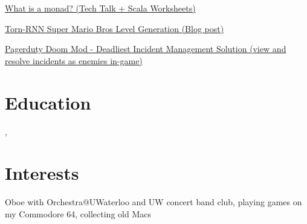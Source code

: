 \documentclass[12pt]{jmichaud-resume}
\begin{document}
\sectionsep
\iffalse
\runsubsection{Rust/Servo Gui Framework Demo} \hfill
\location{Rust}
\begin{tightemize}
	\item Fork of servo browser engine supporting a simple react-like rust html macro and native rust event handlers
	\item Like electron, but using native rust + servo instead of javascript + webkit. 
\end{tightemize}
\sectionsep
\fi
	
 \hfill
{}

\begin{minipage}[t]{0.49\textwidth}
\begin{tightemize}
	\item\href{https://github.com/justinmichaud/scala-monad-worksheets/}{What is a monad? (Tech Talk + Scala Worksheets)}
\end{tightemize}

\end{minipage}
\hfill
\begin{minipage}[t]{0.49\textwidth}
\begin{tightemize}
	\item\href{https://medium.com/@justin_michaud/super-mario-bros-level-generation-using-torch-rnn-726ddea7e9b7}{Torn-RNN Super Mario Bros Level Generation (Blog post)}
\end{tightemize}
\end{minipage}

\begin{tightemize}
	\item\href{https://github.com/justinmichaud/chocolate-doom}{Pagerduty Doom Mod - Deadliest Incident Management Solution (view and resolve incidents as enemies in-game)}
\end{tightemize}

\sectionsep

\section{Education} 
,  \hfill {}

\section{Interests}
Oboe with Orchestra@UWaterloo and UW concert band club, playing games on my Commodore 64, collecting old Macs\\
\end{document}
